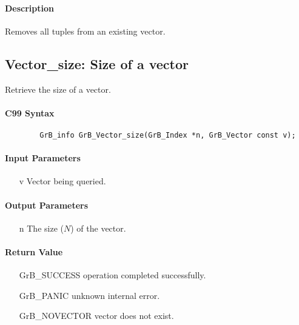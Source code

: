 \paragraph{Description}

Removes all tuples from an existing vector.

\subsection{{\sf Vector\_size}: Size of a vector}

Retrieve the size of a vector.

\paragraph{C99 Syntax}

\begin{verbatim}
        GrB_info GrB_Vector_size(GrB_Index *n, GrB_Vector const v);
\end{verbatim}

\paragraph{Input Parameters}

\begin{itemize}[leftmargin=1.1in]
    \item[{\sf v}] Vector being queried.
\end{itemize}

\paragraph{Output Parameters}
\begin{itemize}[leftmargin=1.1in]
    \item[{\sf n}] The size ($N$) of the vector.
\end{itemize}

\paragraph{Return Value}

\begin{itemize}[leftmargin=2.1in]
\item[{\sf GrB\_SUCCESS}]   operation completed successfully.
\item[{\sf GrB\_PANIC}]     unknown internal error.
\item[{\sf GrB\_NOVECTOR}]  vector does not exist.
\end{itemize}

